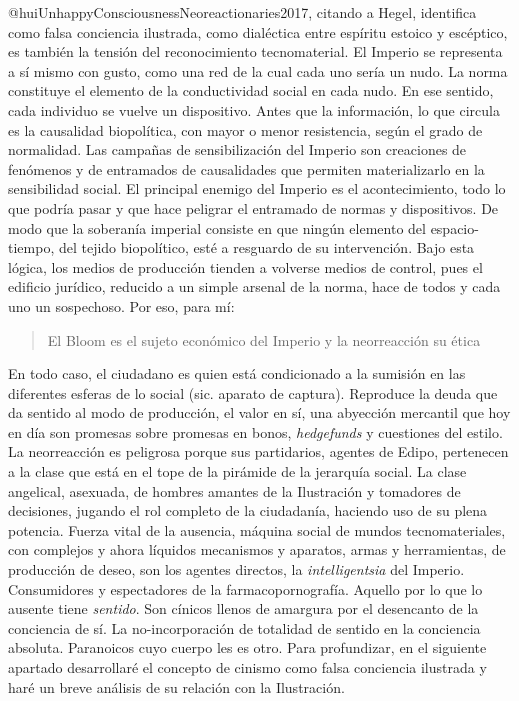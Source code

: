 \documentclass[
]{article}
\begin{document}
@huiUnhappyConsciousnessNeoreactionaries2017, citando a Hegel,
identifica como falsa conciencia ilustrada, como dialéctica entre
espíritu estoico y escéptico, es también la tensión del reconocimiento
tecnomaterial. El Imperio se representa a sí mismo con gusto, como una
red de la cual cada uno sería un nudo. La norma constituye el elemento
de la conductividad social en cada nudo. En ese sentido, cada individuo
se vuelve un dispositivo. Antes que la información, lo que circula es la
causalidad biopolítica, con mayor o menor resistencia, según el grado de
normalidad. Las campañas de sensibilización del Imperio son creaciones
de fenómenos y de entramados de causalidades que permiten materializarlo
en la sensibilidad social. El principal enemigo del Imperio es el
acontecimiento, todo lo que podría pasar y que hace peligrar el
entramado de normas y dispositivos. De modo que la soberanía imperial
consiste en que ningún elemento del espacio-tiempo, del tejido
biopolítico, esté a resguardo de su intervención. Bajo esta lógica, los
medios de producción tienden a volverse medios de control, pues el
edificio jurídico, reducido a un simple arsenal de la norma, hace de
todos y cada uno un sospechoso. Por eso, para mí:

\begin{quote}
El Bloom es el sujeto económico del Imperio y la neorreacción su ética
\end{quote}

En todo caso, el ciudadano es quien está condicionado a la sumisión en
las diferentes esferas de lo social (sic. aparato de captura). Reproduce
la deuda que da sentido al modo de producción, el valor en sí, una
abyección mercantil que hoy en día son promesas sobre promesas en bonos,
\emph{hedgefunds} y cuestiones del estilo. La neorreacción es peligrosa
porque sus partidarios, agentes de Edipo, pertenecen a la clase que está
en el tope de la pirámide de la jerarquía social. La clase angelical,
asexuada, de hombres amantes de la Ilustración y tomadores de
decisiones, jugando el rol completo de la ciudadanía, haciendo uso de su
plena potencia. Fuerza vital de la ausencia, máquina social de mundos
tecnomateriales, con complejos y ahora líquidos mecanismos y aparatos,
armas y herramientas, de producción de deseo, son los agentes directos,
la \emph{intelligentsia} del Imperio. Consumidores y espectadores de la
farmacopornografía. Aquello por lo que lo ausente tiene \emph{sentido}.
Son cínicos llenos de amargura por el desencanto de la conciencia de sí.
La no-incorporación de totalidad de sentido en la conciencia absoluta.
Paranoicos cuyo cuerpo les es otro. Para profundizar, en el siguiente
apartado desarrollaré el concepto de cinismo como falsa conciencia
ilustrada y haré un breve análisis de su relación con la Ilustración.
\end{document}
